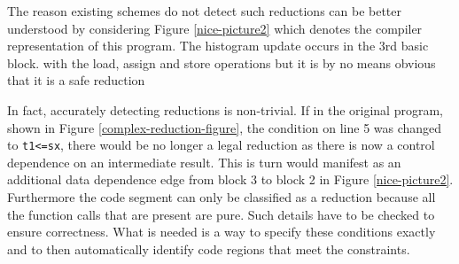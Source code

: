 The reason existing schemes do not detect such reductions can be better understood by considering 
Figure \ref{nice-picture2} which denotes the compiler representation of this 
program.  The histogram update occurs in the 3rd basic block. with the load, assign and store operations but it is by no means obvious that it is a safe reduction

In fact, accurately detecting reductions is non-trivial.  If in the
 original program, shown in Figure \ref{complex-reduction-figure}, the
 condition on line 5 was changed to {\tt t1<=sx}, there would be no
 longer a legal reduction as there is now a control dependence on an
 intermediate result. This is turn would manifest as an additional
 data dependence edge from block 3 to block 2 in
 Figure \ref{nice-picture2}.
Furthermore the code segment can only be classified as a reduction because all the function calls that are present are pure.
 Such details have to be checked to ensure
 correctness. What is needed is a way to specify these conditions
 exactly and to then automatically identify code regions that meet the
 constraints.

 







